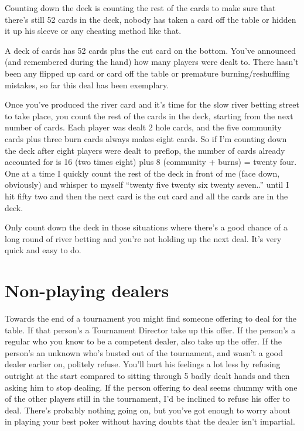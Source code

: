 Counting down the deck is counting the rest of the cards to make
sure that there's still 52 cards in the deck, nobody has
taken a card off the table or hidden it up his sleeve or any
cheating method like that.

A deck of cards has 52 cards plus the cut card on the bottom.
You've announced (and remembered during the hand) how many players
were dealt to. There hasn't been any flipped up card or card
off the table or premature burning/reshuffling mistakes, so far
this deal has been exemplary.

Once you've produced the river card and it's time for the slow
river betting street to take place, you count the rest of the
cards in the deck, starting from the next number of cards.
Each player was dealt 2 hole cards, and the five community
cards plus three burn cards always makes eight cards. So if
I'm counting down the deck after eight players were dealt
to preflop, the number of cards already accounted for is
16 (two times eight) plus 8 (community + burns) = twenty four.
One at a time I quickly count the rest of the deck in front
of me (face down, obviously) and whisper to myself
``twenty five twenty six twenty seven..'' until I hit fifty two
and then the next card is the cut card and all the cards
are in the deck.

Only count down the deck in those situations where there's
a good chance of a long round of river betting and you're
not holding up the next deal. It's very quick and easy to
do.

\section{Non-playing dealers}

Towards the end of a tournament you might find someone offering
to deal for the table. If that person's a Tournament Director
take up this offer. If the person's a
regular who you know to be a competent dealer, also take up
the offer. If the person's an unknown who's busted out of the
tournament, and wasn't a good dealer earlier on, politely
refuse. You'll hurt his feelings a lot less by refusing outright
at the start compared to sitting through 5 badly dealt hands
and then asking him to stop dealing. If the person
offering to deal seems chummy with one of the other players
still in the tournament, I'd be inclined to refuse his offer
to deal. There's probably nothing going on, but you've got
enough to worry about in playing your best poker without
having doubts that the dealer isn't impartial.

